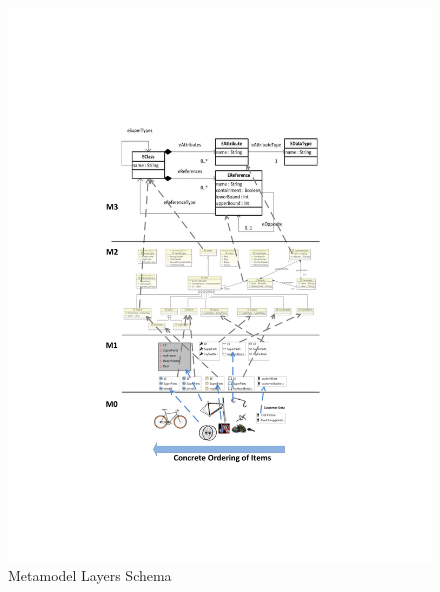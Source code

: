 \begin{figure}[H]
    \begin{center}
        \includegraphics[width=\textwidth]{fig/meta_model_levels.pdf}
        \caption{Metamodel Layers Schema}
        \label{fig.metamodel_layers_schema}
    \end{center}
\end{figure}